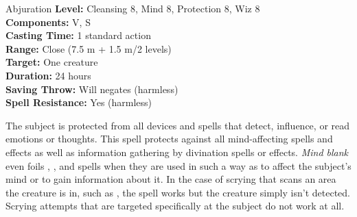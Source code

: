 {Abjuration}
{
	\textbf{Level:}
	Cleansing 8, Mind 8, Protection 8, Wiz 8\\
	\textbf{Components:}
	V, S\\
	\textbf{Casting Time:}
	1 standard action\\
	\textbf{Range:}
	Close (7.5 m + 1.5 m/2 levels)\\
	\textbf{Target:}
	One creature\\
	\textbf{Duration:}
	24 hours\\
	\textbf{Saving Throw:}
	Will negates (harmless)\\
	\textbf{Spell Resistance:}
	Yes (harmless)\\
}
{
	The subject is protected from all devices and spells that detect, influence, or read emotions or thoughts. This spell protects against all mind-affecting spells and effects as well as information gathering by divination spells or effects. \emph{Mind blank} even foils , , and  spells when they are used in such a way as to affect the subject's mind or to gain information about it. In the case of scrying that scans an area the creature is in, such as , the spell works but the creature simply isn't detected. Scrying attempts that are targeted specifically at the subject do not work at all.

}
